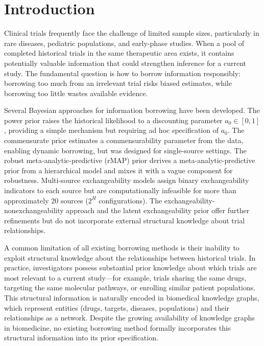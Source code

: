 \documentclass[12pt]{article}
\begin{document}
\newpage

\section{Introduction}
\label{sec:introduction}

Clinical trials frequently face the challenge of limited sample sizes, particularly in rare diseases, pediatric populations, and early-phase studies. When a pool of completed historical trials in the same therapeutic area exists, it contains potentially valuable information that could strengthen inference for a current study. The fundamental question is how to borrow information responsibly: borrowing too much from an irrelevant trial risks biased estimates, while borrowing too little wastes available evidence.

Several Bayesian approaches for information borrowing have been developed. The power prior \citep{ibrahim2000power} raises the historical likelihood to a discounting parameter $a_0 \in [0,1]$, providing a simple mechanism but requiring ad hoc specification of $a_0$. The commensurate prior \citep{hobbs2011hierarchical} estimates a commensurability parameter from the data, enabling dynamic borrowing, but was designed for single-source settings. The robust meta-analytic-predictive (rMAP) prior \citep{schmidli2014robust} derives a meta-analytic-predictive prior from a hierarchical model and mixes it with a vague component for robustness. Multi-source exchangeability models \citep[MEM;][]{kaizer2018bayesian} assign binary exchangeability indicators to each source but are computationally infeasible for more than approximately 20 sources ($2^H$ configurations). The exchangeability-nonexchangeability approach \citep[EXNEX;][]{neuenschwander2016robust} and the latent exchangeability prior \citep[LEAP;][]{alt2024leap} offer further refinements but do not incorporate external structural knowledge about trial relationships.

A common limitation of all existing borrowing methods is their inability to exploit structural knowledge about the relationships between historical trials. In practice, investigators possess substantial prior knowledge about which trials are most relevant to a current study---for example, trials sharing the same drugs, targeting the same molecular pathways, or enrolling similar patient populations. This structural information is naturally encoded in biomedical knowledge graphs, which represent entities (drugs, targets, diseases, populations) and their relationships as a network. Despite the growing availability of knowledge graphs in biomedicine, no existing borrowing method formally incorporates this structural information into its prior specification.
\end{document}
